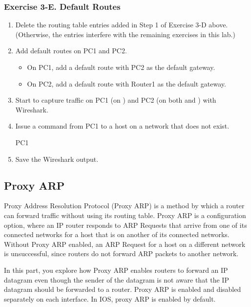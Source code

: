 \subsubsection*{Exercise 3-E. Default Routes}
\begin{enumerate}
	\item Delete the routing table entries added in Step 1 of Exercise 3-D above. (Otherwise, the entries interfere with the remaining exercises in this lab.)
	\item Add default routes on PC1 and PC2.
		\begin{itemize}
			\item On PC1, add a default route with PC2 as the default gateway.
			\item On PC2, add a default route with Router1 as the default gateway.
		\end{itemize}
	\item Start to capture traffic on PC1 (on ) and PC2 (on both  and ) with Wireshark.
	\item Issue a  command from PC1 to a host on a network that does not exist.
		\begin{cmdblock}
	PC1%
		\end{cmdblock}
	\item Save the Wireshark output.
\end{enumerate}

\begin{questions}
\end{questions}

\newpage
\subsection{Proxy ARP}
Proxy Address Resolution Protocol (Proxy ARP) is a method by which a router can forward traffic without using its routing table. Proxy ARP is a configuration option, where an IP router responds to ARP Requests that arrive from one of its connected networks for a host that is on another of its connected networks. Without Proxy ARP enabled, an ARP Request for a host on a different network is unsuccessful, since routers do not forward ARP packets to another network.

In this part, you explore how Proxy ARP enables routers to forward an IP datagram even though the sender of the datagram is not aware that the IP datagram should be forwarded to a router. Proxy ARP is enabled and disabled separately on each interface. In IOS, proxy ARP is enabled by default.

